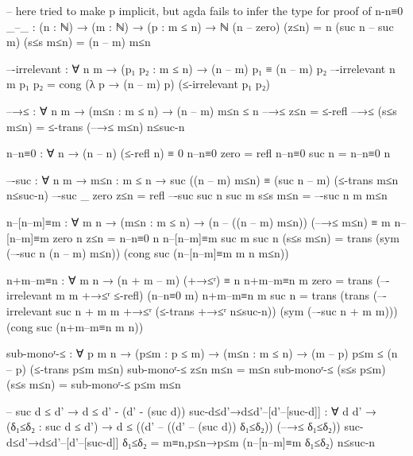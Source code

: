 \documentclass{article}
\begin{document}
\begin{prev}
\begin{code}
-- here tried to make p implicit, but agda fails to infer the type for proof of n-n≡0
_–_ : (n : ℕ) → (m : ℕ) → (p : m ≤ n) → ℕ
(n – zero) (z≤n) = n
(suc n – suc m) (s≤s m≤n) = (n – m) m≤n


–-irrelevant : ∀ {n m} → (p₁ p₂ : m ≤ n) → (n – m) p₁ ≡ (n – m) p₂
–-irrelevant {n} {m} p₁ p₂ = cong (λ p → (n – m) p) (≤-irrelevant p₁ p₂)

–→≤ : ∀ {n m} → (m≤n : m ≤ n) → (n – m) m≤n ≤ n
–→≤ z≤n = ≤-refl
–→≤ (s≤s m≤n) = ≤-trans (–→≤ m≤n) n≤suc-n

n–n≡0 : ∀ {n} → (n – n) (≤-refl {n}) ≡ 0
n–n≡0 {zero} = refl
n–n≡0 {suc n} = n–n≡0 {n}

–-suc : ∀ {n m} → {m≤n : m ≤ n} 
            → suc ((n – m) m≤n) ≡ (suc n – m) (≤-trans m≤n n≤suc-n)
–-suc {_} {zero} {z≤n} = refl
–-suc {suc n} {suc m} {s≤s m≤n} = –-suc {n} {m} {m≤n}

n–[n–m]≡m : ∀ {m n} → (m≤n : m ≤ n) 
                → (n – ((n – m) m≤n)) (–→≤ m≤n) ≡ m 
n–[n–m]≡m {zero} {n} z≤n = n–n≡0 {n}
n–[n–m]≡m {suc m} {suc n} (s≤s m≤n) = 
    trans (sym (–-suc {n} {(n – m) m≤n})) 
            (cong suc (n–[n–m]≡m {m} {n} m≤n))

n+m–m≡n : ∀ {m n} → (n + m – m) (+→≤ʳ) ≡ n
n+m–m≡n {m} {zero} = trans (–-irrelevant {m} {m} +→≤ʳ ≤-refl) (n–n≡0 {m})
n+m–m≡n {m} {suc n} = trans (trans (–-irrelevant {suc n + m} {m} +→≤ʳ (≤-trans +→≤ʳ n≤suc-n)) (sym (–-suc {n + m} {m}))) (cong suc (n+m–m≡n {m} {n}))

sub-monoʳ-≤ : ∀ {p m n} → (p≤m : p ≤ m) → (m≤n : m ≤ n) → (m – p) p≤m ≤ (n – p) (≤-trans p≤m m≤n)
sub-monoʳ-≤ z≤n m≤n = m≤n
sub-monoʳ-≤ (s≤s p≤m) (s≤s m≤n) = sub-monoʳ-≤ p≤m m≤n

-- suc d ≤ d' → d ≤ d' - (d' - (suc d))
suc-d≤d'→d≤d'–[d'–[suc-d]] : ∀ {d d'} → (δ₁≤δ₂ : suc d ≤ d') → d ≤ ((d' – ((d' – (suc d)) δ₁≤δ₂)) (–→≤ δ₁≤δ₂))
suc-d≤d'→d≤d'–[d'–[suc-d]] δ₁≤δ₂ = m≡n,p≤n→p≤m (n–[n–m]≡m δ₁≤δ₂) n≤suc-n
\end{code}
\end{prev}
\end{document}
